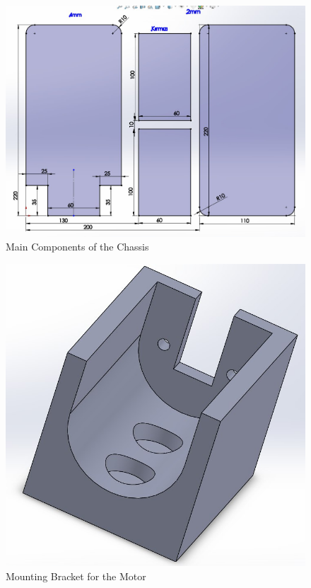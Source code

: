 \documentclass[a4paper,12pt]{article}
\begin{document}
\begin{itemize}
	    \begin{figure}[H]
			\center
			\setlength{\unitlength}{\textwidth} 
			\includegraphics[width=0.7\unitlength]{sasi}
			\caption{\label{fig:chass} Main Components of the Chassis}
		\end{figure}
		
		\begin{figure}[H]
			\center
			\setlength{\unitlength}{\textwidth} 
			\includegraphics[width=0.4\unitlength]{motor_conn}
			\caption{\label{fig:brac} Mounting Bracket for the Motor}
		\end{figure}
		

\end{itemize}
\end{document}
